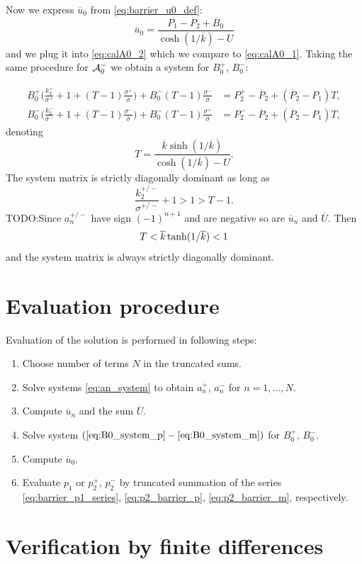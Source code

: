 \documentclass[a4paper,10pt]{article}
\def\todo#1{{TODO:\color{red}#1}}
\def\ol#1{\overline{#1}}
\begin{document}
Now we express $\ol{u}_0$ from \eqref{eq:barrier_u0_def}:
\[
    \ol{u}_0 = \frac{P_1 - \ol{P}_2 + \ol{B}_0}{\cosh(1/\ol{k}) - U}
\]
and we plug it into  \eqref{eq:calA0_2} which we compare to \eqref{eq:calA0_1}. Taking the same procedure for ${\cal A}_0^-$ we
obtain a system for $B_0^+$, $B_0^-$:


\begin{align}
    \label{eq:B0_system_p}
    B_0^+\Big(\frac{k_2^+}{\sigma^+} + 1 +(T-1)\frac{\sigma^+}{\ol{\sigma}}\Big)  + B_0^-(T-1)\frac{\sigma^-}{\ol{\sigma}}
    &= P_2^+ - \ol{P}_2 +  (\ol{P}_2 - P_1) T, \\
%   
    \label{eq:B0_system_m}
    B_0^-\Big(\frac{k_2^-}{\sigma^-} + 1 +(T-1)\frac{\sigma^-}{\ol{\sigma}}\Big)  + B_0^-(T-1)\frac{\sigma^+}{\ol{\sigma}}
    &= P_2^- - \ol{P}_2 +  (\ol{P}_2 - P_1) T, 
\end{align}
denoting
\[
    T  = \frac{\ol{k}\sinh( 1/\ol{k} )}{\cosh(1/\ol{k}) - U}.
\]
The system matrix is strictly diagonally dominant as long as 
\[
    \frac{k_2^{+/-}}{\sigma^{+/-}} + 1 > 1 > T -1.
\]
\todo{Since $a_n^{+/-}$ have sign $(-1)^{n+1}$ and are negative so are $\ol{u}_n$ and $\ol{U}$.} Then
\[
    T < \ol{k}\, {\rm tanh}( 1/\ol{k} ) < 1
\]
and the system matrix is always strictly diagonally dominant.

\section{Evaluation procedure}

Evaluation of the solution is performed in following steps:
\begin{enumerate}
    \item Choose number of terms $N$ in the truncated sums.
    \item Solve systems \eqref{eq:an_system} to obtain $a_n^+$, $a_n^-$ for $n=1,\dots, N$.
    \item Compute $\ol{u}_n$ and the sum $\ol{U}$.
    \item Solve system $(\ref{eq:B0_system_p} - \ref{eq:B0_system_m})$ for $B_0^+$, $B_0^-$.
    \item Compute $\ol{u}_0$.
    \item Evaluate $p_1$ or $p_2^+$, $p_2^-$ by truncated summation of the series \eqref{eq:barrier_p1_series},
          \eqref{eq:p2_barrier_p}, \eqref{eq:p2_barrier_m}, respectively.
\end{enumerate}

\section{Verification by finite differences}
\end{document}
